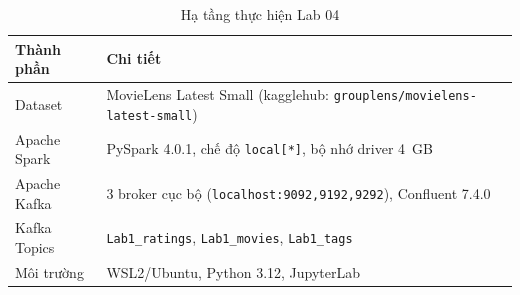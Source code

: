\begin{table}[h]
\centering
\begin{tabular}{|l|l|}
\hline
\textbf{Thành phần} & \textbf{Chi tiết} \\
\hline
Dataset & MovieLens Latest Small (kagglehub: \texttt{grouplens/movielens-latest-small}) \\
\hline
Apache Spark & PySpark 4.0.1, chế độ \texttt{local[*]}, bộ nhớ driver 4~GB \\
\hline
Apache Kafka & 3 broker cục bộ (\texttt{localhost:9092,9192,9292}), Confluent 7.4.0 \\
\hline
Kafka Topics & \texttt{Lab1\_ratings}, \texttt{Lab1\_movies}, \texttt{Lab1\_tags} \\
\hline
Môi trường & WSL2/Ubuntu, Python 3.12, JupyterLab \\
\hline
\end{tabular}
\caption{Hạ tầng thực hiện Lab 04}
\end{table}
